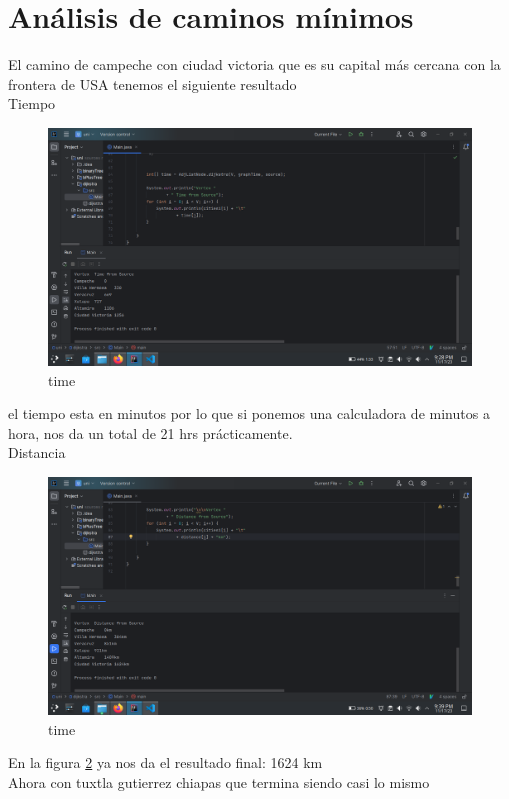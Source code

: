 \documentclass{article}
\begin{document}
\section{Análisis de caminos mínimos}
El camino de campeche con ciudad victoria que es su capital más cercana con la frontera de USA tenemos el siguiente resultado
\\
Tiempo
\begin{figure}[H]
  \centering
  \includegraphics[scale=0.3]{../imgs/campeche.png}
  \caption{time}
  \label{fig:6}
\end{figure}

el tiempo esta en minutos por lo que si ponemos una calculadora de minutos a hora, nos da un total de 21 hrs prácticamente.
\\
Distancia
\begin{figure}[H]
  \centering
  \includegraphics[scale=0.3]{../imgs/campeche1.png}
  \caption{time}
  \label{fig:7}
\end{figure}

En la figura \ref{fig:7} ya nos da el resultado final: 1624 km
\\
Ahora con tuxtla gutierrez chiapas que termina siendo casi lo mismo
\end{document}
